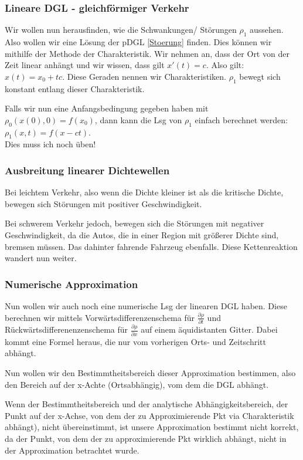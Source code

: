 \documentclass[]{article}
\begin{document}
\subsubsection*{Lineare DGL - gleichförmiger Verkehr}

Wir wollen nun herausfinden, wie die Schwankungen/ Störungen $\rho_1$ aussehen. Also wollen wir eine Lösung der pDGL \ref{Stoerung} finden. Dies können wir mithilfe der Methode der Charakteristik. Wir nehmen an, dass der Ort von der Zeit linear anhängt und wir wissen, dass gilt $x'(t)=c$. Also gilt: $x(t)=x_0+tc$. Diese Geraden nennen wir Charakteristiken. $\rho_1$ bewegt sich konstant entlang dieser Charakteristik.

Falls wir nun eine Anfangsbedingung gegeben haben mit $\rho_0(x(0),0)= f(x_0)$, dann kann die Lsg von $\rho_1$ einfach berechnet werden: $\rho_1(x,t)= f(x-ct)$. \\

Dies muss ich noch üben!

\subsubsection*{Ausbreitung linearer Dichtewellen}  
Bei leichtem Verkehr, also wenn die Dichte kleiner ist als die kritische Dichte, bewegen sich Störungen mit positiver Geschwindigkeit.
 
Bei schwerem Verkehr jedoch, bewegen sich die Störungen mit negativer Geschwindigkeit, da die Autos, die in einer Region mit größerer Dichte sind, bremsen müssen. Das dahinter fahrende Fahrzeug ebenfalls. Diese Kettenreaktion wandert nun weiter. 

\subsubsection*{Numerische Approximation}

Nun wollen wir auch noch eine numerische Lsg der linearen DGL haben. Diese berechnen wir mittels Vorwärtsdifferenzenschema für $\frac{\partial \rho}{\partial t}$ und Rückwärtsdifferenenzenschema für $\frac{\partial \rho}{\partial x}$ auf einem äquidistanten Gitter. Dabei kommt eine Formel heraus, die nur vom vorherigen Orts- und Zeitschritt abhängt. 
 
Nun wollen wir den Bestimmtheitsbereich dieser Approximation bestimmen, also den Bereich auf der x-Achte (Ortsabhängig), vom dem die DGL abhängt.
 
Wenn der Bestimmtheitsbereich und der analytische Abhängigkeitsbereich, der Punkt auf der x-Achse, von dem der zu Approximierende Pkt via Charakteristik abhängt), nicht übereinstimmt, ist unsere Approximation bestimmt nicht korrekt, da der Punkt, von dem der zu approximierende Pkt wirklich abhängt, nicht in der Approximation betrachtet wurde. 
  
\end{document}
